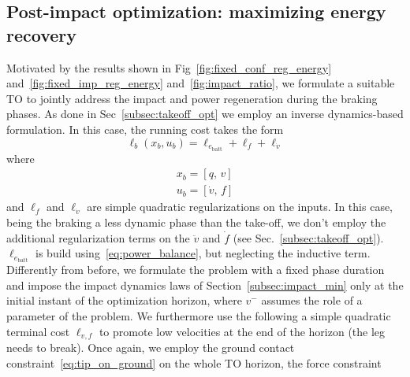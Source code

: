 \subsection{Post-impact optimization: maximizing energy recovery}\label{subsec:energy_rec_opt}
Motivated by the results shown in Fig~\ref{fig:fixed_conf_reg_energy} and~\ref{fig:fixed_imp_reg_energy} and~\ref{fig:impact_ratio}, we formulate a suitable TO to jointly address the impact and power regeneration during the braking phases. As done in Sec~\ref{subsec:takeoff_opt} we employ an inverse dynamics-based formulation. In this case, the running cost takes the form
\begin{dmath}\label{eq:takeoff_running_cost_braking}
    \ell_{b}(x_b, u_b) = \ell_{e_{\mathrm{batt}}} + \ell_f + \ell_{\dot{v}}
\end{dmath}
where
\begin{eqnarray}
    x_b = \left[q,\,v\right]\\
    u_b = \left[\dot{v},\,f\right]
\end{eqnarray}
and $\ell_f$ and $\ell_{\dot{v}}$ are simple quadratic regularizations on the inputs. In this case, being the braking a less dynamic phase than the take-off, we don't employ the additional regularization terms on the $\ddot{v}$ and $\dot{f}$ (see Sec.~\ref{subsec:takeoff_opt}). $\ell_{e_{\mathrm{batt}}}$ is build using~\eqref{eq:power_balance}, but neglecting the inductive term. 
Differently from before, we formulate the problem with a fixed phase duration and impose the impact dynamics laws of Section~\ref{subsec:impact_min} only at the initial instant of the optimization horizon, where $v^{-}$ assumes the role of a parameter of the problem. We furthermore use the following a simple quadratic terminal cost $\ell_{v, f}$ to promote low velocities at the end of the horizon (the leg needs to break).
Once again, we employ the ground contact constraint~\eqref{eq:tip_on_ground} on the whole TO horizon, the force constraint
